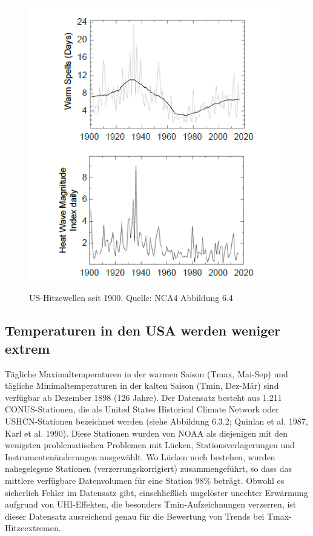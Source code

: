 \documentclass[12pt,paper=a4,DIV=12,parskip=never,chapterprefix=false,headings=standardclasses]{scrreprt}
\begin{document}
\begin{figure}[H]
\begin{center}
\includegraphics[width=1.0\textwidth]{bilder/bilderKlima-0042.png}\\[1cm]
\end{center}
\caption{US-Hitzewellen seit 1900. Quelle: NCA4 Abbildung 6.4}
\end{figure}

\subsection{Temperaturen in den USA werden weniger extrem}

Tägliche Maximaltemperaturen in der warmen Saison (Tmax, Mai-Sep) und tägliche Minimaltemperaturen in der kalten Saison (Tmin, Dez-Mär) sind verfügbar ab Dezember 1898 (126 Jahre). Der Datensatz besteht aus 1.211 CONUS-Stationen, die als United States Historical Climate Network oder USHCN-Stationen bezeichnet werden (siehe Abbildung 6.3.2; Quinlan et al. 1987, Karl et al. 1990). Diese Stationen wurden von NOAA als diejenigen mit den wenigsten problematischen Problemen mit Lücken, Stationsverlagerungen und Instrumentenänderungen ausgewählt. Wo Lücken noch bestehen, wurden nahegelegene Stationen (verzerrungskorrigiert) zusammengeführt, so dass das mittlere verfügbare Datenvolumen für eine Station 98\% beträgt. Obwohl es sicherlich Fehler im Datensatz gibt, einschließlich ungelöster unechter Erwärmung aufgrund von UHI-Effekten, die besonders Tmin-Aufzeichnungen verzerren, ist dieser Datensatz ausreichend genau für die Bewertung von Trends bei Tmax-Hitzeextremen.
\end{document}
